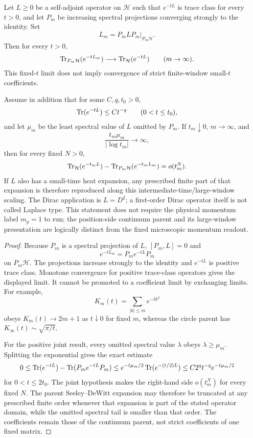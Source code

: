 \documentclass[12pt,a4paper]{article}
\begin{document}
\begin{theorem}
\label{p3:thm:directed-spectral-window-exhaustion}
Let \(L\ge0\) be a self-adjoint operator on \(\mathcal H\) such that
\(e^{-tL}\) is trace class for every \(t>0\), and let \(P_m\) be increasing
spectral projections converging strongly to the identity.  Set
\[
        L_m=P_mLP_m\big|_{P_m\mathcal H}.
\]
Then for every \(t>0\),
\[
        \operatorname{Tr}_{P_m\mathcal H}(e^{-tL_m})
        \longrightarrow
        \operatorname{Tr}_{\mathcal H}(e^{-tL})
        \qquad(m\to\infty).
\]
This fixed-\(t\) limit does not imply convergence of strict finite-window
small-\(t\) coefficients.

Assume in addition that for some \(C,q,t_0>0\),
\[
 \operatorname{Tr}(e^{-tL})\le Ct^{-q}\qquad(0<t\le t_0),
\]
and let \(\mu_m\) be the least spectral value of \(L\) omitted by \(P_m\).
If
\(t_m\downarrow0\), \(m\to\infty\), and
\[
 \frac{t_m\mu_m}{|\log t_m|}\longrightarrow\infty,
\]
then for every fixed \(N>0\),
\[
 \operatorname{Tr}_{\mathcal H}(e^{-t_mL})
 -\operatorname{Tr}_{P_m\mathcal H}(e^{-t_mL_m})
 =o(t_m^N).
\]
If \(L\) also has a small-time heat expansion, any prescribed finite part of
that expansion is therefore reproduced along this
intermediate-time/large-window scaling.  The Dirac application is
\(L=D^2\); a first-order Dirac operator itself is not called Laplace type.
This statement
does not require the physical momentum label \(m_p=1\) to run; the
position-side continuum parent and its large-window presentation are
logically distinct from the fixed microscopic momentum readout.
\end{theorem}

\begin{proof}
Because \(P_m\) is a spectral projection of \(L\),
\([P_m,L]=0\) and
\[
        e^{-tL_m}=P_me^{-tL}P_m
\]
on \(P_m\mathcal H\).  The projections increase strongly to the identity and
\(e^{-tL}\) is positive trace class.  Monotone
convergence for positive trace-class operators gives the displayed limit.
It cannot be promoted to a coefficient limit by exchanging limits.  For
example,
\[
 K_m(t)=\sum_{|k|\le m}e^{-tk^2}
\]
obeys \(K_m(t)\to2m+1\) as \(t\downarrow0\) for fixed \(m\), whereas
the circle parent has \(K_\infty(t)\sim\sqrt{\pi/t}\).

For the positive joint result, every omitted spectral value \(\lambda\) obeys
\(\lambda\ge\mu_m\).  Splitting the exponential gives the exact estimate
\[
 0\le
 \operatorname{Tr}(e^{-tL})-\operatorname{Tr}(P_me^{-tL}P_m)
 \le e^{-t\mu_m/2}\operatorname{Tr}(e^{-(t/2)L})
 \le C2^q t^{-q}e^{-t\mu_m/2}
\]
for \(0<t\le2t_0\).
The joint hypothesis makes the right-hand side \(o(t_m^N)\) for every
fixed \(N\).  The parent Seeley--DeWitt expansion may therefore be truncated
at any prescribed finite order whenever that expansion is part of the stated
operator domain, while the omitted spectral tail is smaller
than that order.  The coefficients remain those of the continuum parent, not
strict coefficients of one fixed matrix.
\end{proof}
\end{document}
